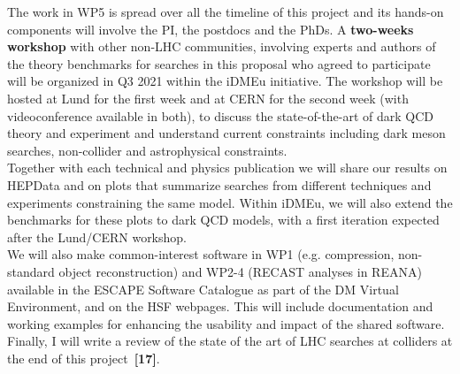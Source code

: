 The work in WP5 is spread over all the timeline of this project and its hands-on components will involve the PI, the postdocs and the PhDs.
A \textbf{two-weeks workshop} with other non-LHC communities, involving experts and authors of the theory benchmarks for searches in this proposal who agreed to participate~\cite{ToBeCited} %
will be organized in Q3 2021 within the iDMEu initiative. 
The workshop will be hosted at Lund for the first week and at CERN for the second week (with videoconference available in both), to discuss the state-of-the-art of dark QCD theory and experiment and understand current constraints including dark meson searches, non-collider and astrophysical constraints. \\
Together with each technical and physics publication we will share our results on HEPData and on plots that summarize searches from different techniques and experiments constraining the same model. Within iDMEu, we will also extend the benchmarks for these plots to dark QCD models, with a first iteration expected after the Lund/CERN workshop. \\
We will also make common-interest software in WP1 (e.g. compression, non-standard object reconstruction) and WP2-4 (RECAST analyses in REANA) available in the ESCAPE Software Catalogue as part of the DM Virtual Environment, and on the HSF webpages. 
This will include documentation and working examples for enhancing the usability and impact of the shared software. \\
Finally, I will write a review of the state of the art of LHC searches at colliders at the end of this project~\textbf{[17]}. 



\clearpage
\begingroup

    \linespread{0.9}\selectfont

\endgroup
  
